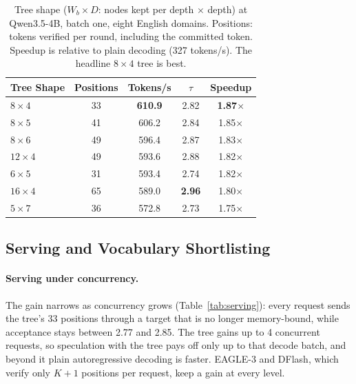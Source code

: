 \documentclass{article}
\newcommand{\TargetFamily}{Qwen3.5\xspace}          %
\newcommand{\ConcurrencyLimit}{4}              %
\begin{document}
\begin{table}[!htbp]
\centering\small
\setlength{\tabcolsep}{4pt}
\caption{Tree shape ($W_b\times D$: nodes kept per depth $\times$ depth) at \TargetFamily-4B, batch one, eight English domains. Positions: tokens verified per round, including the committed token. Speedup is relative to plain decoding (327 tokens/s). The headline $8\times4$ tree is best.}
\label{tab:tree}
\vskip 0.1in
\begin{tabular}{lcccc}
\toprule
Tree Shape & Positions & Tokens/s & $\tau$ & Speedup \\
\midrule
$8\times4$ & 33 & \textbf{610.9} & 2.82 & \textbf{1.87$\times$} \\
$8\times5$ & 41 & 606.2 & 2.84 & 1.85$\times$ \\
$8\times6$ & 49 & 596.4 & 2.87 & 1.83$\times$ \\
$12\times4$ & 49 & 593.6 & 2.88 & 1.82$\times$ \\
$6\times5$ & 31 & 593.4 & 2.74 & 1.82$\times$ \\
$16\times4$ & 65 & 589.0 & \textbf{2.96} & 1.80$\times$ \\
$5\times7$ & 36 & 572.8 & 2.73 & 1.75$\times$ \\
\bottomrule
\end{tabular}
\end{table}

\subsection{Serving and Vocabulary Shortlisting}
\label{sec:serving}

\paragraph{Serving under concurrency.}
The gain narrows as concurrency grows (Table~\ref{tab:serving}): every request sends
the tree's 33 positions through a target that is no longer memory-bound, while
acceptance stays between 2.77 and 2.85. The tree gains up to \ConcurrencyLimit{} concurrent requests, so
speculation with the tree pays off only up to that decode batch, and beyond it
plain autoregressive decoding is faster. EAGLE-3 and DFlash, which verify only $K{+}1$
positions per request, keep a gain at every level.
\end{document}
